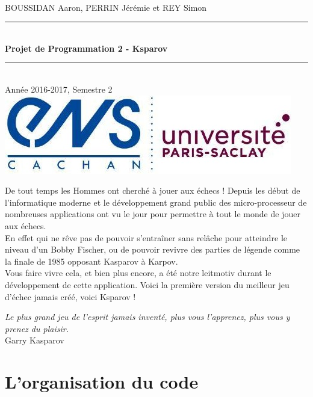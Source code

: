 \documentclass[a4paper]{article}
\newcommand{\HRule}{\rule{\linewidth}{0.5mm}}
\begin{document}
\begin{titlepage}
~\\
BOUSSIDAN Aaron, PERRIN Jérémie et REY Simon\\[5cm]
\begin{center}
\HRule
\\[0.4cm]{\huge\bfseries Projet de Programmation 2 - Ksparov\\[0.4cm]}
\HRule \\[0.5cm]
Année 2016-2017, Semestre 2\\[12cm]
\includegraphics[scale=0.7]{Images/Logo_ENS_PS.jpg}
\end{center}
\end{titlepage}
\tableofcontents

\newpage

De tout temps les Hommes ont cherché à jouer aux échecs ! Depuis les début de l'informatique moderne et le développement grand public des micro-processeur de nombreuses applications ont vu le jour pour permettre à tout le monde de jouer aux échecs. \\

En effet qui ne rêve pas de pouvoir s'entraîner sans relâche pour atteindre le niveau d'un Bobby Fischer, ou de pouvoir revivre des parties de légende comme la finale de 1985 opposant Kasparov à Karpov. \\

Vous faire vivre cela, et bien plus encore, a été notre leitmotiv durant le développement de cette application. Voici la première version du meilleur jeu d'échec jamais créé, voici Ksparov !

\begin{flushright}
\textit{Le plus grand jeu de l'esprit jamais inventé, plus vous l'apprenez, plus vous y prenez du plaisir.}\\

Garry Kasparov
\end{flushright}

\section{L'organisation du code}
\end{document}
